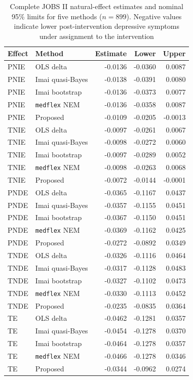 \begin{table}[htbp]
\centering
\caption{Complete JOBS II natural-effect estimates and nominal 95\% limits for five methods ($n=899$). Negative values indicate lower post-intervention depressive symptoms under assignment to the intervention}
\label{tab:application_effects_full}
\small
\begin{tabular}{llrrr}
\toprule
Effect & Method & Estimate & Lower & Upper \\
\midrule
PNIE & OLS delta & -0.0136 & -0.0360 & 0.0087 \\
PNIE & Imai quasi-Bayes & -0.0138 & -0.0391 & 0.0080 \\
PNIE & Imai bootstrap & -0.0136 & -0.0373 & 0.0077 \\
PNIE & \texttt{medflex} NEM & -0.0136 & -0.0358 & 0.0087 \\
PNIE & Proposed & -0.0109 & -0.0205 & -0.0013 \\
\addlinespace[2pt]
TNIE & OLS delta & -0.0097 & -0.0261 & 0.0067 \\
TNIE & Imai quasi-Bayes & -0.0098 & -0.0272 & 0.0060 \\
TNIE & Imai bootstrap & -0.0097 & -0.0289 & 0.0052 \\
TNIE & \texttt{medflex} NEM & -0.0098 & -0.0263 & 0.0068 \\
TNIE & Proposed & -0.0072 & -0.0144 & -0.0001 \\
\addlinespace[2pt]
PNDE & OLS delta & -0.0365 & -0.1167 & 0.0437 \\
PNDE & Imai quasi-Bayes & -0.0357 & -0.1155 & 0.0451 \\
PNDE & Imai bootstrap & -0.0367 & -0.1150 & 0.0451 \\
PNDE & \texttt{medflex} NEM & -0.0369 & -0.1162 & 0.0425 \\
PNDE & Proposed & -0.0272 & -0.0892 & 0.0349 \\
\addlinespace[2pt]
TNDE & OLS delta & -0.0326 & -0.1116 & 0.0464 \\
TNDE & Imai quasi-Bayes & -0.0317 & -0.1128 & 0.0483 \\
TNDE & Imai bootstrap & -0.0327 & -0.1102 & 0.0473 \\
TNDE & \texttt{medflex} NEM & -0.0330 & -0.1113 & 0.0452 \\
TNDE & Proposed & -0.0235 & -0.0835 & 0.0364 \\
\addlinespace[2pt]
TE & OLS delta & -0.0462 & -0.1281 & 0.0357 \\
TE & Imai quasi-Bayes & -0.0454 & -0.1278 & 0.0370 \\
TE & Imai bootstrap & -0.0464 & -0.1278 & 0.0357 \\
TE & \texttt{medflex} NEM & -0.0466 & -0.1278 & 0.0346 \\
TE & Proposed & -0.0344 & -0.0962 & 0.0274 \\
\bottomrule
\end{tabular}
\end{table}
